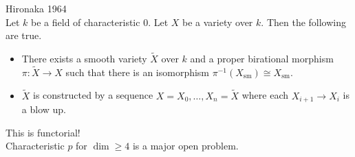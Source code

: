 \documentclass[a4paper]{article}
\begin{document}
\begin{thm}{Hironaka 1964}{}\\
Let $k$ be a field of characteristic $0$. Let $X$ be a variety over $k$. Then the following are true. 
\begin{itemize}
\item There exists a smooth variety $\widetilde{X}$ over $k$ and a proper birational morphism $\pi:\widetilde{X}\to X$ such that there is an isomorphism $\pi^{-1}(X_\text{sm})\cong X_\text{sm}$. 
\item $\widetilde{X}$ is constructed by a sequence $X=X_0,\dots,X_n=\widetilde{X}$ where each $X_{i+1}\to X_i$ is a blow up. 
\end{itemize}
\end{thm}

This is functorial!\\

Characteristic $p$ for $\dim\geq 4$ is a major open problem. 
\end{document}
